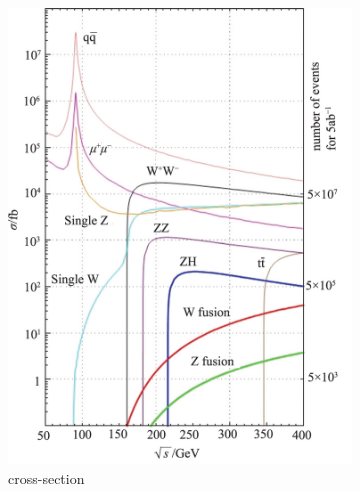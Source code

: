 \begin{figure}
\centering
\begin{subfigure}[b]{0.4\textwidth}
\includegraphics[width=\textwidth]{Figures/ILC_cross_section.png}
\caption{\positron \electron cross-section~\cite{ILC_cross}}
\end{subfigure}
\begin{subfigure}[b]{0.4\textwidth}

\end{subfigure}
\end{figure}
